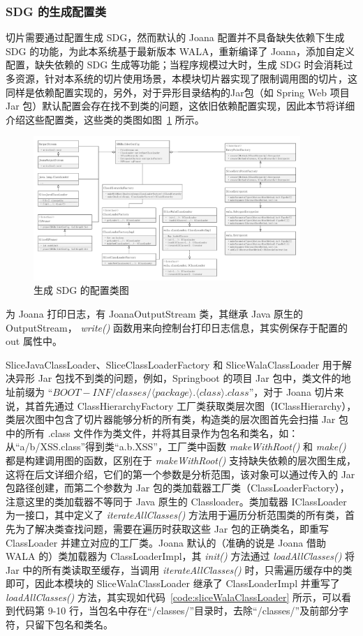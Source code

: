 \subsubsection{SDG 的生成配置类}
切片需要通过配置生成 SDG，然而默认的 Joana 配置并不具备缺失依赖下生成 SDG 的功能，为此本系统基于最新版本 WALA，重新编译了 Joana，添加自定义配置，缺失依赖的 SDG 生成等功能；当程序规模过大时，生成 SDG 时会消耗过多资源，针对本系统的切片使用场景，本模块切片器实现了限制调用图的切片，这同样是依赖配置实现的，另外，对于异形目录结构的Jar包（如 Spring Web 项目 Jar 包）默认配置会存在找不到类的问题，这依旧依赖配置实现，因此本节将详细介绍这些配置类，这些类的类图如图~\ref{JoanaConfig} 所示。

\begin{figure}[!htb]
    \centering
    \includegraphics[width=0.9\textwidth]{FIGs/chapter4/sliceConfigClass.pdf}
    \caption{生成 SDG 的配置类图}\label{JoanaConfig}
\end{figure}

为 Joana 打印日志，有 JoanaOutputStream 类，其继承 Java 原生的 OutputStream， \textit{write()} 函数用来向控制台打印日志信息，其实例保存于配置的 out 属性中。

SliceJavaClassLoader、SliceClassLoaderFactory 和 SliceWalaClassLoader 用于解决异形 Jar 包找不到类的问题，例如，Springboot 的项目 Jar 包中，类文件的地址前缀为 “$BOOT-INF/classes/\langle package \rangle.\langle class \rangle.class $”，对于 Joana 切片来说，其首先通过 ClassHierarchyFactory 工厂类获取类层次图（IClassHierarchy），类层次图中包含了切片器能够分析的所有类，构造类的层次图首先会扫描 Jar 包中的所有 .class 文件作为类文件，并将其目录作为包名和类名，如：从“a/b/XSS.class”得到类“a.b.XSS”，工厂类中函数 \textit{makeWithRoot()} 和 \textit{make()} 都是构建调用图的函数，区别在于 \textit{makeWithRoot()} 支持缺失依赖的层次图生成，这将在后文详细介绍，它们的第一个参数是分析范围，该对象可以通过传入的 Jar 包路径创建，而第二个参数为 Jar 包的类加载器工厂类（ClassLoaderFactory），注意这里的类加载器不等同于 Java 原生的 Classloader。类加载器 IClassLoader 为一接口，其中定义了 \textit{iterateAllClasses()} 方法用于遍历分析范围类的所有类，首先为了解决类查找问题，需要在遍历时获取这些 Jar 包的正确类名，即重写 ClassLoader 并建立对应的工厂类。Joana 默认的（准确的说是 Joana 借助 WALA 的）类加载器为 ClassLoaderImpl，其 \textit{init()} 方法通过 \textit{loadAllClasses()} 将 Jar 中的所有类读取至缓存，当调用 \textit{iterateAllClasses()} 时，只需遍历缓存中的类即可，因此本模块的 SliceWalaClassLoader 继承了 ClassLoaderImpl 并重写了 \textit{loadAllClasses()} 方法，其实现如代码~\ref{code:sliceWalaClassLoader} 所示，可以看到代码第 9-10 行，当包名中存在“/classes/”目录时，去除“/classes/”及前部分字符，只留下包名和类名。


